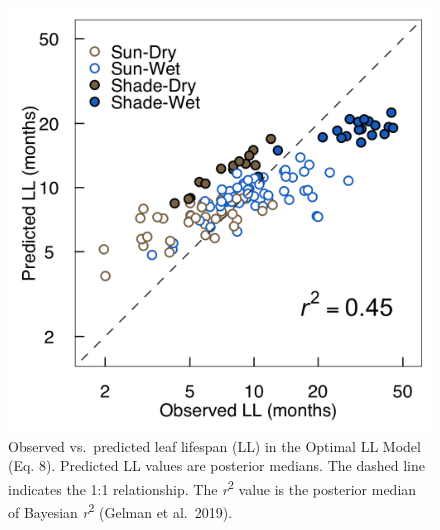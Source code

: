 \documentclass[
  12pt,
]{article}
\begin{document}
\begin{figure}
\hypertarget{fig:LLplt}{%
\centering
\includegraphics{../figs/LL_plot2.png}
\caption{Observed vs.~predicted leaf lifespan (LL) in the Optimal LL Model (Eq. 8).
Predicted LL values are posterior medians.
The dashed line indicates the 1:1 relationship.
The \emph{r}\textsuperscript{2} value is the posterior median of Bayesian \emph{r}\textsuperscript{2} (Gelman et al.~2019).}\label{fig:LLplt}
}
\end{figure}

\newpage
\end{document}
